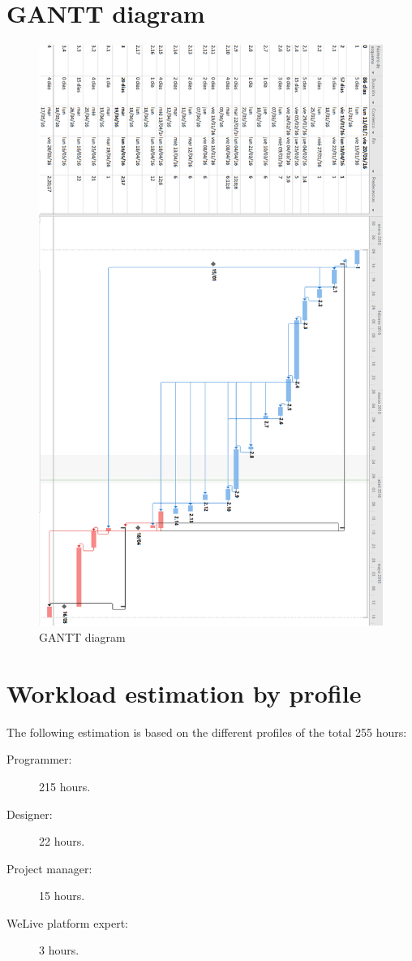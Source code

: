 \documentclass{DeustoFDP}
\begin{document}
\newpage
\section{GANTT diagram}
\begin{figure}[H]
	\centering
	\includegraphics[width=340pt]{fig/gantt}
	\caption{GANTT diagram}\label{fig:gantt}
\end{figure}

\section{Workload estimation by profile}
The following estimation is based on the different profiles of the total 255 hours:
\begin{description}
	\item[Programmer:] 215 hours.
	\item[Designer:] 22 hours.
	\item[Project manager:] 15 hours.
	\item[WeLive platform expert:] 3 hours.
\end{description}
\end{document}
